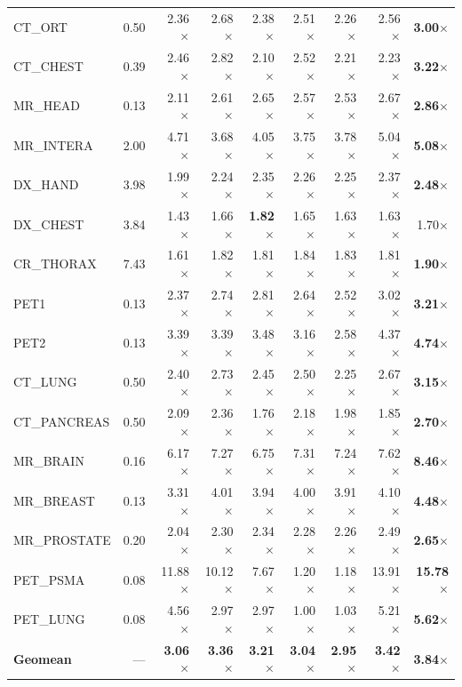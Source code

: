 \documentclass[journal]{IEEEtran}
\begin{document}
\begin{table}[t]
\begin{tabular}{lrrrrrrrr}
CT\_ORT        & 0.50 & 2.36$\times$ & 2.68$\times$ & 2.38$\times$ & 2.51$\times$ & 2.26$\times$ & 2.56$\times$ & \textbf{3.00$\times$} \\
CT\_CHEST      & 0.39 & 2.46$\times$ & 2.82$\times$ & 2.10$\times$ & 2.52$\times$ & 2.21$\times$ & 2.23$\times$ & \textbf{3.22$\times$} \\
MR\_HEAD       & 0.13 & 2.11$\times$ & 2.61$\times$ & 2.65$\times$ & 2.57$\times$ & 2.53$\times$ & 2.67$\times$ & \textbf{2.86$\times$} \\
MR\_INTERA     & 2.00 & 4.71$\times$ & 3.68$\times$ & 4.05$\times$ & 3.75$\times$ & 3.78$\times$ & 5.04$\times$ & \textbf{5.08$\times$} \\
DX\_HAND       & 3.98 & 1.99$\times$ & 2.24$\times$ & 2.35$\times$ & 2.26$\times$ & 2.25$\times$ & 2.37$\times$ & \textbf{2.48$\times$} \\
DX\_CHEST      & 3.84 & 1.43$\times$ & 1.66$\times$ & \textbf{1.82$\times$} & 1.65$\times$ & 1.63$\times$ & 1.63$\times$ & 1.70$\times$ \\
CR\_THORAX     & 7.43 & 1.61$\times$ & 1.82$\times$ & 1.81$\times$ & 1.84$\times$ & 1.83$\times$ & 1.81$\times$ & \textbf{1.90$\times$} \\
PET1           & 0.13 & 2.37$\times$ & 2.74$\times$ & 2.81$\times$ & 2.64$\times$ & 2.52$\times$ & 3.02$\times$ & \textbf{3.21$\times$} \\
PET2           & 0.13 & 3.39$\times$ & 3.39$\times$ & 3.48$\times$ & 3.16$\times$ & 2.58$\times$ & 4.37$\times$ & \textbf{4.74$\times$} \\
CT\_LUNG       & 0.50 & 2.40$\times$ & 2.73$\times$ & 2.45$\times$ & 2.50$\times$ & 2.25$\times$ & 2.67$\times$ & \textbf{3.15$\times$} \\
CT\_PANCREAS   & 0.50 & 2.09$\times$ & 2.36$\times$ & 1.76$\times$ & 2.18$\times$ & 1.98$\times$ & 1.85$\times$ & \textbf{2.70$\times$} \\
MR\_BRAIN      & 0.16 & 6.17$\times$ & 7.27$\times$ & 6.75$\times$ & 7.31$\times$ & 7.24$\times$ & 7.62$\times$ & \textbf{8.46$\times$} \\
MR\_BREAST     & 0.13 & 3.31$\times$ & 4.01$\times$ & 3.94$\times$ & 4.00$\times$ & 3.91$\times$ & 4.10$\times$ & \textbf{4.48$\times$} \\
MR\_PROSTATE   & 0.20 & 2.04$\times$ & 2.30$\times$ & 2.34$\times$ & 2.28$\times$ & 2.26$\times$ & 2.49$\times$ & \textbf{2.65$\times$} \\
PET\_PSMA      & 0.08 & 11.88$\times$ & 10.12$\times$ & 7.67$\times$ & 1.20$\times$ & 1.18$\times$ & 13.91$\times$ & \textbf{15.78$\times$} \\
PET\_LUNG      & 0.08 & 4.56$\times$ & 2.97$\times$ & 2.97$\times$ & 1.00$\times$ & 1.03$\times$ & 5.21$\times$ & \textbf{5.62$\times$} \\
\midrule
\textbf{Geomean} & --- & \textbf{3.06$\times$} & \textbf{3.36$\times$} & \textbf{3.21$\times$} & \textbf{3.04$\times$} & \textbf{2.95$\times$} & \textbf{3.42$\times$} & \textbf{3.84$\times$} \\
\bottomrule
\end{tabular}
\end{table}
\end{document}
